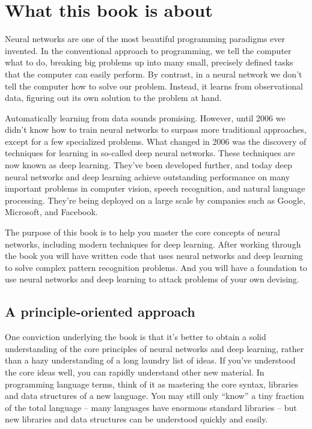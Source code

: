 \documentclass[a4paper,twoside,10pt]{book}
\begin{document}
\chapter*{What this book is about}

Neural networks are one of the most beautiful programming paradigms ever invented. In the conventional approach to programming, we tell the computer what to do, breaking big problems up into many small, precisely defined tasks that the computer can easily perform. By contrast, in a neural network we don't tell the computer how to solve our problem. Instead, it learns from observational data, figuring out its own solution to the problem at hand.

Automatically learning from data sounds promising. However, until 2006 we didn't know how to train neural networks to surpass more traditional approaches, except for a few specialized problems. What changed in 2006 was the discovery of techniques for learning in so-called deep neural networks. These techniques are now known as deep learning. They've been developed further, and today deep neural networks and deep learning achieve outstanding performance on many important problems in computer vision, speech recognition, and natural language processing. They're being deployed on a large scale by companies such as Google, Microsoft, and Facebook.

The purpose of this book is to help you master the core concepts of neural networks, including modern techniques for deep learning. After working through the book you will have written code that uses neural networks and deep learning to solve complex pattern recognition problems. And you will have a foundation to use neural networks and deep learning to attack problems of your own devising.

\section*{A principle-oriented approach}
One conviction underlying the book is that it's better to obtain a solid understanding of the core principles of neural networks and deep learning, rather than a hazy understanding of a long laundry list of ideas. If you've understood the core ideas well, you can rapidly understand other new material. In programming language terms, think of it as mastering the core syntax, libraries and data structures of a new language. You may still only ``know'' a tiny fraction of the total language -- many languages have enormous standard libraries -- but new libraries and data structures can be understood quickly and easily.
\end{document}
